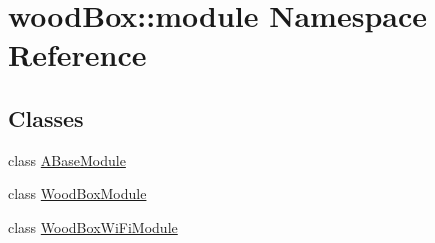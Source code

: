 \hypertarget{namespacewood_box_1_1module}{}\section{wood\+Box\+:\+:module Namespace Reference}
\label{namespacewood_box_1_1module}
\subsection*{Classes}
\begin{DoxyCompactItemize}
\item 
class \mbox{\hyperlink{classwood_box_1_1module_1_1_a_base_module}{A\+Base\+Module}}
\item 
class \mbox{\hyperlink{classwood_box_1_1module_1_1_wood_box_module}{Wood\+Box\+Module}}
\item 
class \mbox{\hyperlink{classwood_box_1_1module_1_1_wood_box_wi_fi_module}{Wood\+Box\+Wi\+Fi\+Module}}
\end{DoxyCompactItemize}
